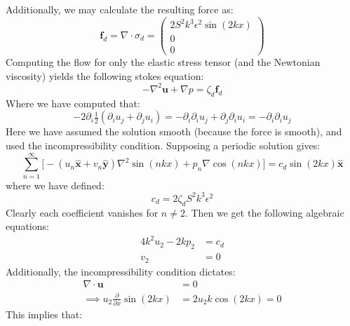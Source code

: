 \documentclass[reqno]{article}
\begin{document}
Additionally, we may calculate the resulting force as:
\begin{equation}
  \mathbf{f}_d
  =
  \nabla \cdot \sigma_d
  =
  \begin{pmatrix}
    2 S^2 k^3 \epsilon^2 \sin(2kx) \\
    0 \\
    0
  \end{pmatrix}
\end{equation}
Computing the flow for only the elastic stress tensor (and the Newtonian
viscosity) yields the following stokes equation:
\begin{equation} \label{eq:elastic-periodic-stokes}
  -\nabla^2 \mathbf{u} + \nabla p
  =
  \zeta_d \mathbf{f}_d
\end{equation}
Where we have computed that:
\begin{equation}
  -2 \partial_i \tfrac12 \left( \partial_i u_j + \partial_j u_i \right)
  =
  - \partial_i \partial_i u_j + \partial_j \partial_i u_i
  =
  - \partial_i \partial_i u_j
\end{equation}
Here we have assumed the solution smooth (because the force is smooth), and used
the incompressibility condition.
Supposing a periodic solution gives:
\begin{equation}
  \sum_{n = 1}^\infty \biggl[  -(u_n \mathbf{\hat{x}} + v_n \mathbf{\hat{y}}) \nabla^2 \sin(n k x) 
  +  p_n\nabla \cos(n k x) \biggr]
  =
  c_d \sin(2kx) \mathbf{\hat{x}}
\end{equation}
where we have defined:
\begin{equation}
  c_d = 2 \zeta_d S^2 k^3 \epsilon^2
\end{equation}
Clearly each coefficient vanishes for $n \neq 2$.
Then we get the following algebraic equations:
\begin{equation}
\begin{split}
  4 k^2 u_2 - 2 k p_2 &= c_d \\
  v_2 &= 0
\end{split}
\end{equation}
Additionally, the incompressibility condition dictates:
\begin{equation}
  \begin{split}
    \nabla \cdot \mathbf{u} &= 0 \\
    \implies u_2 \frac{\partial}{\partial x} \sin(2kx)
                            &= 2 u_2 k \cos(2kx)
                              = 0
  \end{split}
\end{equation}
This implies that:
\end{document}
